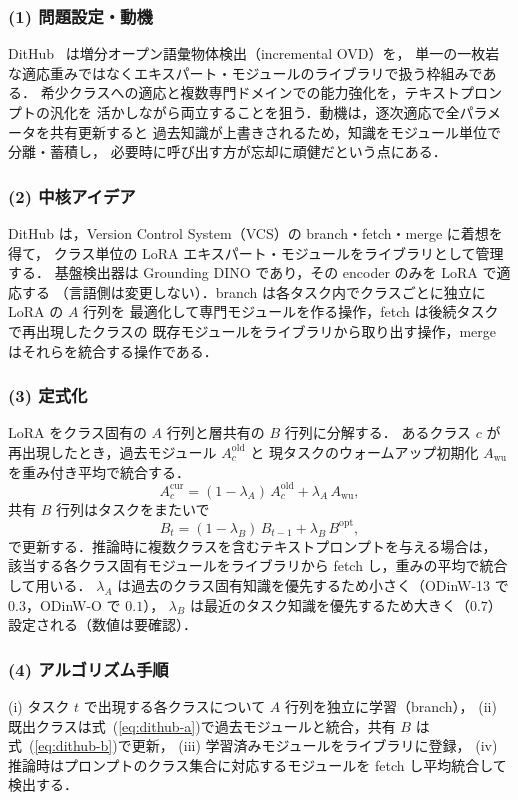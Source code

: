 \subsubsection*{(1) 問題設定・動機}
DitHub~\cite{dithub} は増分オープン語彙物体検出（incremental OVD）を，
単一の一枚岩な適応重みではなくエキスパート・モジュールのライブラリで扱う枠組みである．
希少クラスへの適応と複数専門ドメインでの能力強化を，テキストプロンプトの汎化を
活かしながら両立することを狙う．動機は，逐次適応で全パラメータを共有更新すると
過去知識が上書きされるため，知識をモジュール単位で分離・蓄積し，
必要時に呼び出す方が忘却に頑健だという点にある．

\subsubsection*{(2) 中核アイデア}
DitHub は，Version Control System（VCS）の branch・fetch・merge に着想を得て，
クラス単位の LoRA エキスパート・モジュールをライブラリとして管理する．
基盤検出器は Grounding DINO であり，その encoder のみを LoRA で適応する
（言語側は変更しない）．branch は各タスク内でクラスごとに独立に LoRA の $A$ 行列を
最適化して専門モジュールを作る操作，fetch は後続タスクで再出現したクラスの
既存モジュールをライブラリから取り出す操作，merge はそれらを統合する操作である．

\subsubsection*{(3) 定式化}
LoRA をクラス固有の $A$ 行列と層共有の $B$ 行列に分解する．
あるクラス $c$ が再出現したとき，過去モジュール $A_c^{\mathrm{old}}$ と
現タスクのウォームアップ初期化 $A_{\mathrm{wu}}$ を重み付き平均で統合する．
\begin{equation}
A_c^{\mathrm{cur}} = (1-\lambda_A)\,A_c^{\mathrm{old}} + \lambda_A\,A_{\mathrm{wu}},
\label{eq:dithub-a}
\end{equation}
共有 $B$ 行列はタスクをまたいで
\begin{equation}
B_t = (1-\lambda_B)\,B_{t-1} + \lambda_B\,B^{\mathrm{opt}},
\label{eq:dithub-b}
\end{equation}
で更新する．推論時に複数クラスを含むテキストプロンプトを与える場合は，
該当する各クラス固有モジュールをライブラリから fetch し，重みの平均で統合して用いる．
$\lambda_A$ は過去のクラス固有知識を優先するため小さく（ODinW-13 で $0.3$，ODinW-O で $0.1$），
$\lambda_B$ は最近のタスク知識を優先するため大きく（$0.7$）設定される（数値は要確認）．

\subsubsection*{(4) アルゴリズム手順}
(i) タスク $t$ で出現する各クラスについて $A$ 行列を独立に学習（branch），
(ii) 既出クラスは式~(\ref{eq:dithub-a})で過去モジュールと統合，共有 $B$ は式~(\ref{eq:dithub-b})で更新，
(iii) 学習済みモジュールをライブラリに登録，
(iv) 推論時はプロンプトのクラス集合に対応するモジュールを fetch し平均統合して検出する．

